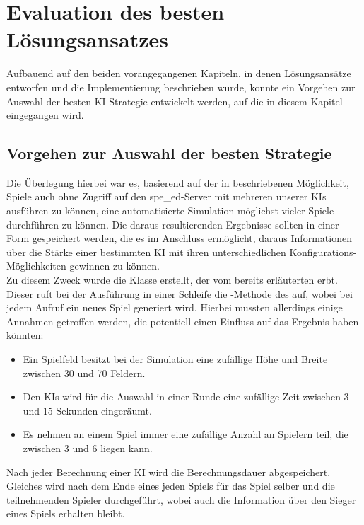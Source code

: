 \chapter{Evaluation des besten Lösungsansatzes}
\label{ch:evaluation-loesungsansatz}

Aufbauend auf den beiden vorangegangenen Kapiteln, in denen Lösungsansätze entworfen und die Implementierung
beschrieben wurde, konnte ein Vorgehen zur Auswahl der besten \ac{KI}-Strategie entwickelt werden, auf die in diesem
Kapitel eingegangen wird.

\section{Vorgehen zur Auswahl der besten Strategie}
\label{sec:auswahl-strategie}

Die Überlegung hierbei war es, basierend auf der in  beschriebenen
Möglichkeit, Spiele auch ohne Zugriff auf den spe\_ed-Server mit mehreren unserer \ac{KI}s ausführen zu können,
eine automatisierte Simulation möglichst vieler Spiele durchführen zu können.
Die daraus resultierenden Ergebnisse sollten in einer Form gespeichert werden, die es im Anschluss ermöglicht, daraus
Informationen über die Stärke einer bestimmten \ac{KI} mit ihren unterschiedlichen Konfigurations-Möglichkeiten gewinnen
zu können. \\

Zu diesem Zweck wurde die Klasse  erstellt, der vom bereits erläuterten
 erbt.
Dieser ruft bei der Ausführung in einer Schleife die -Methode des  auf, wobei bei
jedem Aufruf ein neues Spiel generiert wird.
Hierbei mussten allerdings einige Annahmen getroffen werden, die potentiell einen Einfluss auf das Ergebnis haben
könnten:

\begin{itemize}
    \item Ein Spielfeld besitzt bei der Simulation eine zufällige Höhe und Breite zwischen 30 und 70 Feldern.
    \item Den \ac{KI}s wird für die Auswahl in einer Runde eine zufällige Zeit zwischen 3 und 15 Sekunden eingeräumt.
    \item Es nehmen an einem Spiel immer eine zufällige Anzahl an Spielern teil, die zwischen 3 und 6 liegen kann.
\end{itemize}

Nach jeder Berechnung einer \ac{KI} wird die Berechnungsdauer abgespeichert.
Gleiches wird nach dem Ende eines jeden Spiels für das Spiel selber und die teilnehmenden Spieler durchgeführt, wobei
auch die Information über den Sieger eines Spiels erhalten bleibt.

